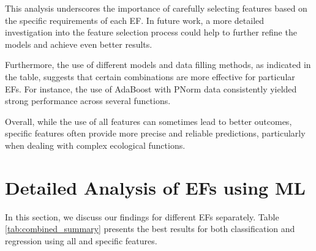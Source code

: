 \documentclass[12pt,letterpaper]{article}
\begin{document}
This analysis underscores the importance of carefully selecting features based on the specific requirements of each \ac{EF}. In future work, a more detailed investigation into the feature selection process could help to further refine the models and achieve even better results.

Furthermore, the use of different models and data filling methods, as indicated in the table, suggests that certain combinations are more effective for particular \acp{EF}. For instance, the use of AdaBoost with \ac{PNorm} data consistently yielded strong performance across several functions. 

Overall, while the use of all features can sometimes lead to better outcomes, specific features often provide more precise and reliable predictions, particularly when dealing with complex ecological functions.


\clearpage


\section{Detailed Analysis of \ac{EF}s using \ac{ML}}
In this section, we discuss our findings for different \ac{EF}s separately. Table \ref{tab:combined_summary} presents the best results for both classification and regression using all and specific features. 
\end{document}
